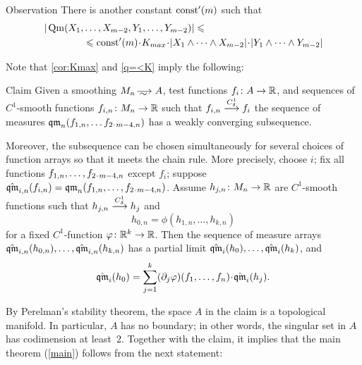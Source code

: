 \begin{thm}{Observation}\label{q=<K}
There is another constant $\mathrm{const}'(m)$ such that 
\begin{align*}
|\Qm(X_1,&\dots,X_{m-2},Y_1,\dots,Y_{m-2})|\le
\\
&\le 
\const'(m)\cdot K_{max}\cdot|X_1\wedge\dots\wedge X_{m-2}|\cdot |Y_1\wedge\dots\wedge Y_{m-2}|
\end{align*}

\end{thm}

Note that \ref{cor:Kmax} and \ref{q=<K} imply the following:

\begin{thm}{Claim}\label{clm:weak-partial-limit}
Given a smoothing $M_n\smooths{} A$,
test functions $f_i\:A\zz\to \RR$,
and sequences of $C^1$-smooth functions $f_{i,n}\colon M_n\to \mathbb{R}$ such that 
$f_{i,n}\zz\smoothto f_i$ the sequence of measures 
$\qm_n(f_{1,n},\zz\dots f_{2\cdot m-4,n})$ has a weakly converging subsequence.

Moreover, the subsequence can be chosen simultaneously for several choices of function arrays so that it meets the chain rule.
More precisely, choose $i$; fix all functions $f_{1,n},\zz\dots, f_{2\cdot m-4,n}$ except $f_i$;
suppose $\hat\qm_{i,n}(f_{i,n})=\qm_n(f_{1,n},\zz\dots, f_{2\cdot m-4,n})$.
Assume $h_{j,n}\colon M_n\to \mathbb{R}$ are $C^1$-smooth functions such that 
$h_{j,n}\zz\smoothto h_j$ and 
\[h_{0,n}=\phi(h_{1,n},\dots,h_{k,n})\]
for a fixed $C^1$-function $\varphi\colon\mathbb{R}^k\to\mathbb{R}$.
Then the sequence of measure arrays $\hat\qm_{i,n}(h_{0,n}),\zz\dots,\hat\qm_{i,n}(h_{k,n})$
has a partial limit $\hat\qm_{i}(h_0),\zz\dots,\hat\qm_{i}(h_k)$, and
\[\hat\qm_{i}(h_0)=\sum_{j=1}^k (\partial_j\phi)(f_1,\dots,f_n)\cdot\hat\qm_{i}(h_j).\]

\end{thm}


By Perelman's stability theorem, the space $A$ in the claim is a topological manifold.
In particular, $A$ has no boundary;
in other words, the singular set in $A$ has codimension at least~2.
Together with the claim, it implies that the main theorem (\ref{main}) follows from the next statement:

